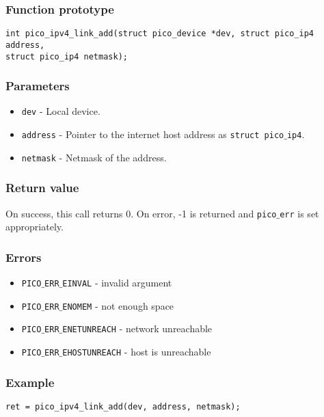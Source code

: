 \subsubsection*{Function prototype}
\begin{verbatim}
int pico_ipv4_link_add(struct pico_device *dev, struct pico_ip4 address,
struct pico_ip4 netmask);
\end{verbatim}

\subsubsection*{Parameters}
\begin{itemize}[noitemsep]
\item \texttt{dev} - Local device.
\item \texttt{address} - Pointer to the internet host address as \texttt{struct pico$\_$ip4}.
\item \texttt{netmask} - Netmask of the address.
\end{itemize}

\subsubsection*{Return value}
On success, this call returns 0.
On error, -1 is returned and \texttt{pico$\_$err} is set appropriately.

\subsubsection*{Errors}
\begin{itemize}[noitemsep]
\item \texttt{PICO$\_$ERR$\_$EINVAL} - invalid argument
\item \texttt{PICO$\_$ERR$\_$ENOMEM} - not enough space
\item \texttt{PICO$\_$ERR$\_$ENETUNREACH} - network unreachable
\item \texttt{PICO$\_$ERR$\_$EHOSTUNREACH} - host is unreachable
\end{itemize}

\subsubsection*{Example}
\begin{verbatim}
ret = pico_ipv4_link_add(dev, address, netmask);
\end{verbatim}



